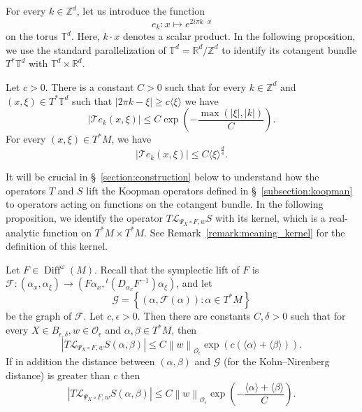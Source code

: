 \documentclass[AHL,Unicode,longabstracts,published]{cedram}
\DeclareMathOperator{\Diff}{Diff}
\newcommand{\set}[1]{\left\{ #1 \right\}}
\newcommand{\p}[1]{\left(#1\right)}
\newcommand{\n}[1]{\left\|#1\right\|}
\newcommand{\va}[1]{\left|#1\right|}
\newcommand{\brac}[1]{\langle #1 \rangle}
\newcommand{\clO}{\mathcal{O}}
\newcommand{\clL}{\mathcal{L}}
\newcommand{\clF}{\mathcal{F}}
\newcommand{\clT}{\mathcal{T}}
\newcommand{\clG}{\mathcal{G}}
\newcommand{\bbZ}{\mathbb{Z}}
\newcommand{\bbT}{\mathbb{T}}
\newcommand{\bbR}{\mathbb{R}}
\newcommand{\clO}{\mathcal{O}}
\begin{document}
For every $k \in \bbZ^d$, let us introduce the function
\begin{equation*}
e_k : x \mapsto e^{2 i \pi k \cdot x}
\end{equation*}
on the torus $\bbT^d$. Here, $k\cdot x$ denotes a scalar product. In the following proposition, we use the standard parallelization of $\bbT^d = \bbR^d / \bbZ^d$ to identify its cotangent bundle $T^* \bbT^d$ with $\bbT^d \times \bbR^d$.

\begin{prop}\label{proposition:localisation_torus}
Let $c > 0$. There is a constant $C > 0$ such that for every $k \in \bbZ^d$ and $(x,\xi) \in T^* \bbT^d$ such that $\va{2 \pi k - \xi} \geq c \brac{\xi}$ we have
\begin{equation}\label{eq:better_torus}
\va{\clT e_k(x,\xi)} \leq C \exp\p{- \frac{\max(\va{\xi},\va{k})}{C}}.
\end{equation}
For every $(x,\xi) \in T^* M$, we have
\begin{equation}\label{eq:straightforward_torus}
\va{\clT e_k(x,\xi)} \leq C \brac{\xi}^{\frac{d}{4}}.
\end{equation}
\end{prop}

It will be crucial in \S~\ref{section:construction} below to understand how the operators $T$ and $S$ lift the Koopman operators defined in \S~\ref{subsection:koopman} to operators acting on functions on the cotangent bundle. In the following proposition, we identify the operator $T \clL_{\Psi_X \circ F,w} S$ with its kernel, which is a real-analytic function on $T^* M \times T^* M$. See Remark~\ref{remark:meaning_kernel} for the definition of this kernel.

\begin{prop}\label{proposition:localisation_graph}
Let $F \in \Diff^\omega(M)$. Recall that the symplectic lift of $F$ is $\clF : (\alpha_x,\alpha_\xi) \to (F \alpha_x, {}^t (D_{\alpha_x} F^{-1}) \alpha_\xi)$, and let
\begin{equation*}
\clG = \set{ (\alpha,\clF(\alpha)): \alpha \in T^* M}
\end{equation*}
be the graph of $\clF$. Let $c,\epsilon > 0$. Then there are constants $C,\delta > 0$ such that for every $X \in B_{\epsilon,\delta}, w \in \clO_\epsilon$ and $\alpha,\beta \in T^* M$, then
\begin{equation}\label{eq:small_exponential_bound}
\va{T \clL_{\Psi_X \circ F,w} S(\alpha,\beta)} \leq C \n{w}_{\clO_\epsilon} \exp\p{c (\brac{\alpha} + \brac{\beta})}.
\end{equation}
If in addition the distance between $(\alpha,\beta)$ and $\clG$ (for the Kohn--Nirenberg distance) is greater than $c$ then
\begin{equation}\label{eq:exponential_decay_Koopman}
\va{T \clL_{\Psi_X \circ F,w} S(\alpha,\beta)} \leq C \n{w}_{\clO_\epsilon} \exp\p{ - \frac{\brac{\alpha} + \brac{\beta}}{C}}.
\end{equation}
\end{prop}
\end{document}
